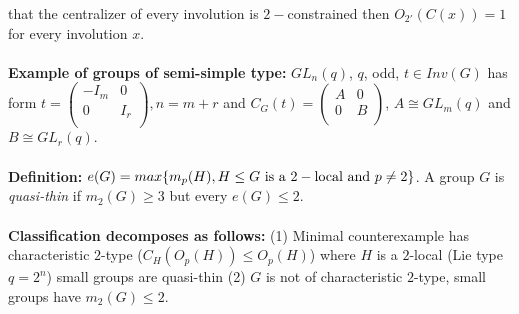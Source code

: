 that the centralizer of every involution is $2-$constrained then $O_{2'}(C(x))=1$ for
every involution $x$.
\\
\\
{\bf Example of groups of semi-simple type:} $GL_n(q)$, $q$, odd, $t \in Inv(G)$ has
form 
$t= \left(
\begin{array}{cc}
-I_m & 0\\
0 & I_r\\
\end{array}
\right), n= m+r$ and 
$C_G(t)= \left(
\begin{array}{cc}
A & 0\\
0 & B\\
\end{array}
\right)$, 
$A \cong GL_m(q)$ and
$B \cong GL_r(q)$. \\
\\
{\bf Definition:} 
$e(G)= max \{ m_p(H),
H \le G  \textnormal{ is a } 2-\textnormal{local and } p \ne 2 \}$.
A group $G$ is \emph{quasi-thin} if 
$m_2(G) \ge 3$ but every $e(G) \le 2$.
\\
\\
{\bf Classification decomposes as follows:} (1) Minimal counterexample has characteristic
$2$-type ($C_H(O_p(H)) \le O_p(H)$) where $H$ is a $2$-local (Lie type $q= 2^n$) small
groups are quasi-thin (2) $G$ is not of characteristic $2$-type, small groups have
$m_2(G) \le 2$.
